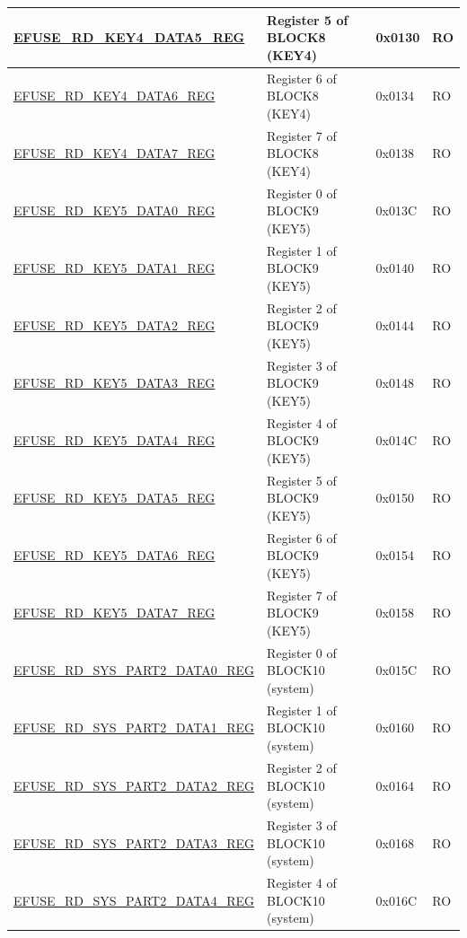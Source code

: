 \begin{longtable}{ | p{6.8cm} | p{7cm} | p{1.3cm} | p{1.2cm} | }
    \hyperref[regdesc:EFUSERDKEY4DATANREG]{EFUSE\_RD\_KEY4\_DATA5\_REG} & Register 5 of BLOCK8 (KEY4) & 0x0130 & RO \\ \hline
    \hyperref[regdesc:EFUSERDKEY4DATANREG]{EFUSE\_RD\_KEY4\_DATA6\_REG} & Register 6 of BLOCK8 (KEY4) & 0x0134 & RO \\ \hline
    \hyperref[regdesc:EFUSERDKEY4DATANREG]{EFUSE\_RD\_KEY4\_DATA7\_REG} & Register 7 of BLOCK8 (KEY4) & 0x0138 & RO \\ \hline
    \hyperref[regdesc:EFUSERDKEY5DATANREG]{EFUSE\_RD\_KEY5\_DATA0\_REG} & Register 0 of BLOCK9 (KEY5) & 0x013C & RO \\ \hline
    \hyperref[regdesc:EFUSERDKEY5DATANREG]{EFUSE\_RD\_KEY5\_DATA1\_REG} & Register 1 of BLOCK9 (KEY5) & 0x0140 & RO \\ \hline
    \hyperref[regdesc:EFUSERDKEY5DATANREG]{EFUSE\_RD\_KEY5\_DATA2\_REG} & Register 2 of BLOCK9 (KEY5) & 0x0144 & RO \\ \hline
    \hyperref[regdesc:EFUSERDKEY5DATANREG]{EFUSE\_RD\_KEY5\_DATA3\_REG} & Register 3 of BLOCK9 (KEY5) & 0x0148 & RO \\ \hline
    \hyperref[regdesc:EFUSERDKEY5DATANREG]{EFUSE\_RD\_KEY5\_DATA4\_REG} & Register 4 of BLOCK9 (KEY5) & 0x014C & RO \\ \hline
    \hyperref[regdesc:EFUSERDKEY5DATANREG]{EFUSE\_RD\_KEY5\_DATA5\_REG} & Register 5 of BLOCK9 (KEY5) & 0x0150 & RO \\ \hline
    \hyperref[regdesc:EFUSERDKEY5DATANREG]{EFUSE\_RD\_KEY5\_DATA6\_REG} & Register 6 of BLOCK9 (KEY5) & 0x0154 & RO \\ \hline
    \hyperref[regdesc:EFUSERDKEY5DATANREG]{EFUSE\_RD\_KEY5\_DATA7\_REG} & Register 7 of BLOCK9 (KEY5) & 0x0158 & RO \\ \hline
    \hyperref[regdesc:EFUSERDSYSPART2DATANREG]{EFUSE\_RD\_SYS\_PART2\_DATA0\_REG} & Register 0 of BLOCK10 (system) & 0x015C & RO \\ \hline
    \hyperref[regdesc:EFUSERDSYSPART2DATANREG]{EFUSE\_RD\_SYS\_PART2\_DATA1\_REG} & Register 1 of BLOCK10 (system) & 0x0160 & RO \\ \hline
    \hyperref[regdesc:EFUSERDSYSPART2DATANREG]{EFUSE\_RD\_SYS\_PART2\_DATA2\_REG} & Register 2 of BLOCK10 (system) & 0x0164 & RO \\ \hline
    \hyperref[regdesc:EFUSERDSYSPART2DATANREG]{EFUSE\_RD\_SYS\_PART2\_DATA3\_REG} & Register 3 of BLOCK10 (system) & 0x0168 & RO \\ \hline
    \hyperref[regdesc:EFUSERDSYSPART2DATANREG]{EFUSE\_RD\_SYS\_PART2\_DATA4\_REG} & Register 4 of BLOCK10 (system) & 0x016C & RO \\ \hline

\end{longtable}
